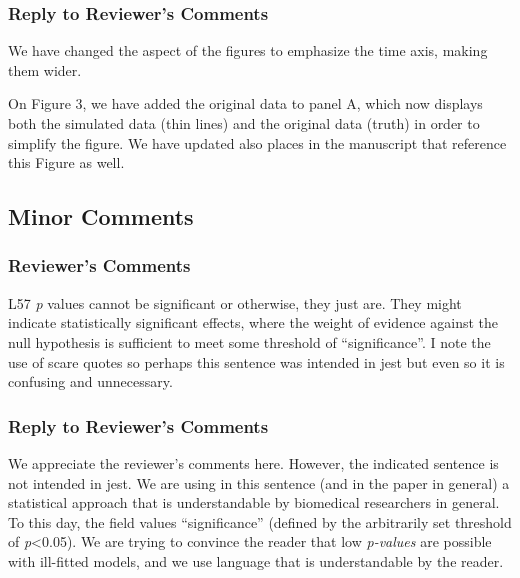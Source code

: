 \documentclass[
]{article}
\begin{document}
\hypertarget{section-17}{%
\subsubsection{\texorpdfstring{\textcolor{reviewersblue} {Reply to Reviewer's Comments}}{}}\label{section-17}}

We have changed the aspect of the figures to emphasize the time axis, making them wider.

On Figure 3, we have added the original data to panel A, which now displays both the simulated data (thin lines) and the original data (truth) in order to simplify the figure. We have updated also places in the manuscript that reference this Figure as well.

\hypertarget{minor-comments}{%
\subsection{Minor Comments}\label{minor-comments}}

\hypertarget{reviewers-comments-17}{%
\subsubsection{Reviewer's Comments}\label{reviewers-comments-17}}

L57 \emph{p} values cannot be significant or otherwise, they just are. They might indicate statistically significant effects, where the weight of evidence against the null hypothesis is sufficient to meet some threshold of ``significance''. I note the use of scare quotes so perhaps this sentence was intended in jest but even
so it is confusing and unnecessary.

\hypertarget{section-18}{%
\subsubsection{\texorpdfstring{\textcolor{reviewersblue} {Reply to Reviewer's Comments}}{}}\label{section-18}}

We appreciate the reviewer's comments here. However, the indicated sentence is not intended in jest. We are using in this sentence (and in the paper in general) a statistical approach that is understandable by biomedical researchers in general. To this day, the field values ``significance'' (defined by the arbitrarily set threshold of \emph{p}\textless0.05). We are trying to convince the reader that low \emph{p-values} are possible with ill-fitted models, and we use language that is understandable by the reader.
\end{document}
